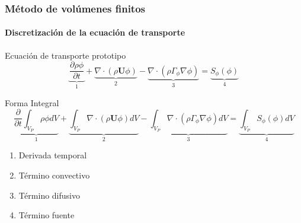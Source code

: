 














      
\begin{frame}
    \frametitle{M\'etodo de vol\'umenes finitos}
    \framesubtitle{Discretizaci\'on de la ecuaci\'on de transporte}


        \begin{block}{\centering Ecuaci\'on de transporte prototipo}
            $$ \underbrace{\frac{\partial \rho \phi}{\partial t}}_1 + 
               \underbrace{\nabla \cdot (\rho \mathbf{U} \phi)}_2 - 
               \underbrace{\nabla \cdot (\rho \Gamma_{\phi} \nabla \phi)}_3 = 
               \underbrace{S_{\phi}(\phi)}_4$$
        \end{block}          

        \begin{block}{\centering Forma Integral}
            \footnotesize
            $$  \underbrace{ \frac{\partial}{\partial t} \int_{V_{P}}\rho \phi dV}_1 + 
                \underbrace{ \int_{V_{P}}\nabla \cdot (\rho \mathbf{U} \phi) dV }_2 - 
                \underbrace{ \int_{V_{P}}\nabla \cdot (\rho \Gamma_{\phi} \nabla \phi) dV }_3 =  
                \underbrace{ \int_{V_{P}}S_{\phi}(\phi) dV }_4$$
        \end{block} 
    
        
        \begin{enumerate}
            \footnotesize
            \item Derivada temporal
            \item T\'ermino convectivo
            \item T\'ermino difusivo
            \item T\'ermino fuente
        \end{enumerate}      


\end{frame}
    



